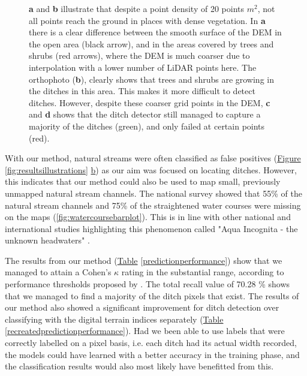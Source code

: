 \documentclass[11pt, review]{elsarticle} %
\begin{document}
\begin{figure}[!htb]
    \caption{\textbf{a} and \textbf{b} illustrate that despite a point density of 20 points $m^2$, not all points reach the ground in places with dense vegetation. In \textbf{a} there is a clear difference between the smooth surface of the DEM in the open area (black arrow), and in the areas covered by trees and shrubs (red arrows), where the DEM is much coarser due to interpolation with a lower number of LiDAR points here. The orthophoto (\textbf{b}), clearly shows that trees and shrubs are growing in the ditches in this area. This makes it more difficult to detect ditches. However, despite these coarser grid points in the DEM, \textbf{c} and \textbf{d} shows that the ditch detector still managed to capture a majority of the ditches (green), and only failed at certain points (red).}
    \label{fig:resultstreesbushes}
\end{figure}

With our method, natural streams were often classified as false positives (\hyperref[fig:resultsillustrations]{Figure} \ref{fig:resultsillustrations} \hyperref[fig:resultsillustrations]{b}) as our aim was focused on locating ditches. However, this indicates that our method could also be used to map small, previously unmapped natural stream channels. The national survey showed that 55\% of the natural stream channels and 75\% of the straightened water courses were missing on the maps (\autoref{fig:watercoursebarplot}). This is in line with other national \citep{kuglerova} and international \citep{benstead} studies highlighting this phenomenon called "Aqua Incognita - the unknown headwaters" \citep{bishop,kuglerova}.

The results from our method (\hyperref[predictionperformance]{Table} \ref{predictionperformance}) show that we managed to attain a Cohen's $\kappa$ rating in the substantial range, according to performance thresholds proposed by \citet{kappaanalysis}. The total recall value of 70.28 \% shows that we managed to find a majority of the ditch pixels that exist. The results of our method also showed a significant improvement for ditch detection over classifying with the digital terrain indices separately (\hyperref[recreatedpredictionperformance]{Table} \ref{recreatedpredictionperformance}). Had we been able to use labels that were correctly labelled on a pixel basis, i.e. each ditch had its actual width recorded, the models could have learned with a better accuracy in the training phase, and the classification results would also most likely have benefitted from this.
\end{document}
